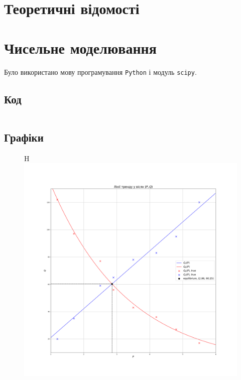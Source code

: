 




\tableofcontents

\section{Теоретичні відомості}



\section{Чисельне моделювання}

Було використано мову програмування \texttt{Python} і модуль \texttt{scipy}.

\subsection{Код}

\inputminted{python}{lab-3/py/all.py}

\subsection{Графіки}

\begin{figure}{H}
	\centering
	\includegraphics[width=\textwidth]{p_q.png}
\end{figure}

